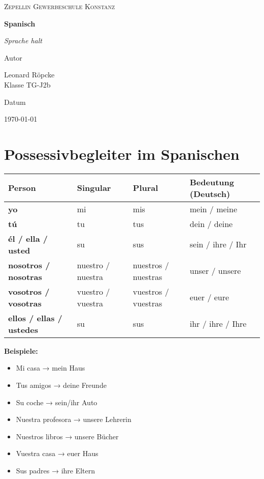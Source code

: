 \documentclass{article}
\newcommand{\AuthorName}{Leonard Röpcke\\Klasse TG-J2b}
\newcommand{\Institute}{Zepellin Gewerbeschule Konstanz}
\newcommand{\Subtitle}{Sprache halt}
\newcommand{\MyDate}{\today}
\begin{document}
\begin{titlepage}
  \centering
  {\scshape\LARGE \Institute \par}
  \vspace{2.5cm}
  {\huge\bfseries Spanisch\par}
  \vspace{0.8cm}
  {\Large\itshape \Subtitle \par}
  \vfill
  {\Large Autor\par}
  {\Large \AuthorName \par}
  \vspace{1cm}
  {\Large Datum\par}
  {\Large \MyDate \par}
  \vfill
  \vspace{1cm}
  {\small }
\end{titlepage}
\tableofcontents
\newpage


\section*{Possessivbegleiter im Spanischen}

\begin{tabular}{>{\bfseries}l l l l}
\toprule
\textbf{Person} & \textbf{Singular} & \textbf{Plural} & \textbf{Bedeutung (Deutsch)} \\
\midrule
yo & mi & mis & mein / meine \\
tú & tu & tus & dein / deine \\
él / ella / usted & su & sus & sein / ihre / Ihr \\
nosotros / nosotras & nuestro / nuestra & nuestros / nuestras & unser / unsere \\
vosotros / vosotras & vuestro / vuestra & vuestros / vuestras & euer / eure \\
ellos / ellas / ustedes & su & sus & ihr / ihre / Ihre \\
\bottomrule
\end{tabular}

\vspace{1em}

\noindent\textbf{Beispiele:}
\begin{itemize}
    \item Mi casa → mein Haus
    \item Tus amigos → deine Freunde
    \item Su coche → sein/ihr Auto
    \item Nuestra profesora → unsere Lehrerin
    \item Nuestros libros → unsere Bücher
    \item Vuestra casa → euer Haus
    \item Sus padres → ihre Eltern
\end{itemize}
\end{document}
